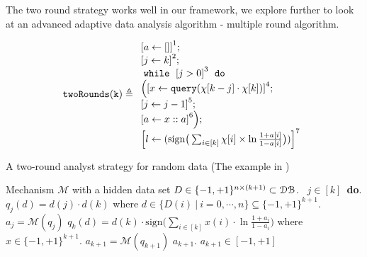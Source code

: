 The two round strategy works well in our framework, we explore further to look at an advanced adaptive data analysis algorithm - multiple round algorithm.
\begin{example}
    \[
        \kw{twoRounds(k)} \triangleq
    \begin{array}{l}
           \clabel{ a \leftarrow []}^{1} ; \\
            \clabel{\assign{j}{k} }^{2} ; \\
            \ewhile ~ \clabel{j > 0}^{3} ~ \edo ~ \\
            \Big(
             \clabel{\assign{x}{\query(\chi[k - j]\cdot \chi[k])} }^{4}  ; \\
             \clabel{\assign{j}{j-1}}^{5} ;\\
            \clabel{a \leftarrow x :: a}^{6}       \Big);\\
            \clabel{l \leftarrow (\mathrm{sign}\big (\sum_{i\in [k]} \chi[i]\times\ln\frac{1+a[i]}{1-a[i]} \big ))}^{7}\\
        \end{array}
    \]
    \begin{algorithm}
    \footnotesize
    \caption{A two-round analyst strategy for random data (The example in  \cite{dwork2015preserving})}
    \label{alg:twoRound}
    \begin{algorithmic}
    \REQUIRE Mechanism $\mathcal{M}$ with a hidden data set $D \in \{-1,+1\}^{n\times (k+1)} \subset \mathcal{DB}$.
    \ $j\in [k]$\ {\bf do}.  
    \STATE {} $q_j(d)=d(j)\cdot d(k)$ where $d \in \{D(i) ~|~ i = 0, \cdots, n\} \subseteq \{-1,+1\}^{k+1}$.
    \STATE {} $a_j=\mathcal{M}(q_j)$ 
    \STATE \qquad {}
     $q_{k}(d)= d(k) \cdot \mathrm{sign}\big (\sum_{i\in [k]} x(i) \cdot \ln\frac{1+a_i}{1-a_i} \big )$ where $x\in \{-1,+1\}^{k+1}$.
    \STATE{}
     $a_{k+1}=\mathcal{M}(q_{k+1})$
    \STATE{}
    \RETURN $a_{k+1}$.
    \ENSURE $a_{k+1}\in [-1,+1]$
    \end{algorithmic}
    \end{algorithm}
%
    \end{example}


